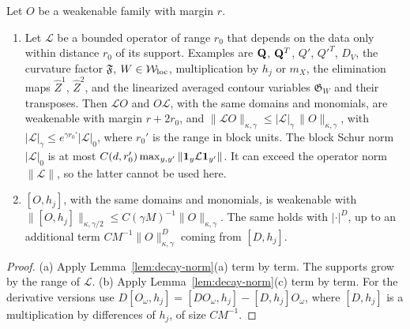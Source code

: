 \begin{lemma}\label{lem:weak-local-ops}
Let $O$ be a weakenable family with margin $r$.
\begin{enumerate}[label=(\alph*)]
\item Let $\mathcal L$ be a bounded operator of range $r_0$ that depends on the data only within distance $r_0$ of its support. Examples are $\mathbf Q$, $\mathbf Q^T$, $Q'$, $Q'^T$, $D_V$, the curvature factor $\mathfrak F$, $W\in\mathcal W_{\rm loc}$, multiplication by $h_j$ or $m_X$, the elimination maps $\hat Z^1$, $\hat Z^2$, and the linearized averaged contour variables $\mathfrak G_W$ and their transposes. Then $\mathcal LO$ and $O\mathcal L$, with the same domains and monomials, are weakenable with margin $r+2r_0$, and $\|\mathcal LO\|_{\kappa,\gamma}\le|\mathcal L|_\gamma\,\|O\|_{\kappa,\gamma}$, with $|\mathcal L|_\gamma\le e^{\gamma r_0'}|\mathcal L|_0$, where $r_0'$ is the range in block units. The block Schur norm $|\mathcal L|_0$ is at most $C(d,r_0')\max_{y,y'}\|\mathbf 1_y\mathcal L\mathbf 1_{y'}\|$. It can exceed the operator norm $\|\mathcal L\|$, so the latter cannot be used here.
\item $[O,h_j]$, with the same domains and monomials, is weakenable with $\|[O,h_j]\|_{\kappa,\gamma/2}\le C(\gamma M)^{-1}\|O\|_{\kappa,\gamma}$. The same holds with $|\cdot|^D$, up to an additional term $CM^{-1}\|O\|^D_{\kappa,\gamma}$ coming from $[D,h_j]$.
\end{enumerate}
\end{lemma}

\begin{proof}
(a) Apply Lemma~\ref{lem:decay-norm}(a) term by term. The supports grow by the range of $\mathcal L$. (b) Apply Lemma~\ref{lem:decay-norm}(c) term by term. For the derivative versions use $D[O_\omega,h_j]=[DO_\omega,h_j]-[D,h_j]O_\omega$, where $[D,h_j]$ is a multiplication by differences of $h_j$, of size $CM^{-1}$.
\end{proof}
